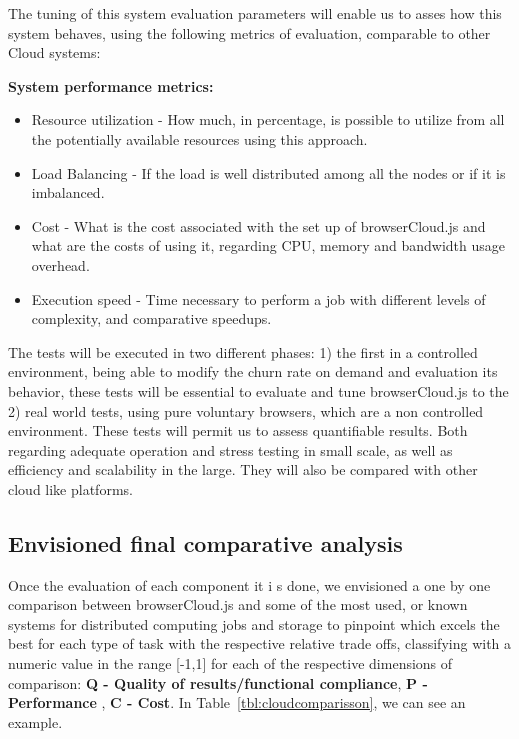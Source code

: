 The tuning of this system evaluation parameters will enable us to asses how this system behaves, using the following metrics of evaluation, comparable to other Cloud systems:

\textbf{System performance metrics:}
\begin{itemize}
  \item Resource utilization - How much, in percentage, is possible to utilize from all the potentially available resources using this approach.
  \item Load Balancing - If the load is well distributed among all the nodes or if it is imbalanced.
  \item Cost - What is the cost associated with the set up of browserCloud.js and what are the costs of using it, regarding CPU, memory and bandwidth usage overhead.
  \item Execution speed - Time necessary to perform a job with different levels of complexity, and comparative speedups.
\end{itemize}

The tests will be executed in two different phases: 1) the first in a controlled environment, being able to modify the churn rate on demand and evaluation its behavior, these tests will be essential to evaluate and tune browserCloud.js to the 2) real world tests, using pure voluntary browsers, which are a non controlled environment. These tests will permit us to assess quantifiable results. Both regarding adequate operation and stress testing in small scale, as well as efficiency and scalability in the large. They will also be compared with other cloud like platforms.

\subsection{Envisioned final comparative analysis}

Once the evaluation of each component it i s done, we envisioned a one by one comparison between browserCloud.js and some of the most used, or known systems for distributed computing jobs and storage to pinpoint which excels the best for each type of task with the respective relative trade offs, classifying with a numeric value in the range [-1,1] for each of the respective dimensions of comparison: \textbf{Q - Quality of results/functional compliance}, \textbf{P - Performance} , \textbf{C - Cost}. In Table~\ref{tbl:cloudcomparisson}, we can see an example.

